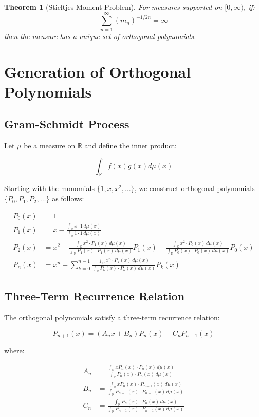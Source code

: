 \documentclass{article}
\newtheorem{theorem}{Theorem}
\begin{document}
\begin{theorem}[Stieltjes Moment Problem]
For measures supported on $[0,\infty)$, if:
\[\sum_{n=1}^{\infty} (m_n)^{-1/2n} = \infty\]
then the measure has a unique set of orthogonal polynomials.
\end{theorem}

\section{Generation of Orthogonal Polynomials}

\subsection{Gram-Schmidt Process}

Let $\mu$ be a measure on $\mathbb{R}$ and define the inner product:

\[\int_{\mathbb{R}} f(x)g(x)d\mu(x)\]

Starting with the monomials $\{1, x, x^2, \ldots\}$, we construct orthogonal polynomials $\{P_0, P_1, P_2, \ldots\}$ as follows:

\begin{align*}
P_0(x) &= 1 \\[10pt]
P_1(x) &= x - \frac{\int_{\mathbb{R}} x \cdot 1 \, d\mu(x)}{\int_{\mathbb{R}} 1 \cdot 1 \, d\mu(x)} \\[10pt]
P_2(x) &= x^2 - \frac{\int_{\mathbb{R}} x^2 \cdot P_1(x) \, d\mu(x)}{\int_{\mathbb{R}} P_1(x) \cdot P_1(x) \, d\mu(x)}P_1(x) - \frac{\int_{\mathbb{R}} x^2 \cdot P_0(x) \, d\mu(x)}{\int_{\mathbb{R}} P_0(x) \cdot P_0(x) \, d\mu(x)}P_0(x) \\[10pt]
P_n(x) &= x^n - \sum_{k=0}^{n-1} \frac{\int_{\mathbb{R}} x^n \cdot P_k(x) \, d\mu(x)}{\int_{\mathbb{R}} P_k(x) \cdot P_k(x) \, d\mu(x)}P_k(x)
\end{align*}

\subsection{Three-Term Recurrence Relation}

The orthogonal polynomials satisfy a three-term recurrence relation:

\[P_{n+1}(x) = (A_n x + B_n)P_n(x) - C_n P_{n-1}(x)\]

where:

\begin{align*}
A_n &= \frac{\int_{\mathbb{R}} xP_n(x) \cdot P_n(x) \, d\mu(x)}{\int_{\mathbb{R}} P_n(x) \cdot P_n(x) \, d\mu(x)} \\[10pt]
B_n &= \frac{\int_{\mathbb{R}} xP_n(x) \cdot P_{n-1}(x) \, d\mu(x)}{\int_{\mathbb{R}} P_{n-1}(x) \cdot P_{n-1}(x) \, d\mu(x)} \\[10pt]
C_n &= \frac{\int_{\mathbb{R}} P_n(x) \cdot P_n(x) \, d\mu(x)}{\int_{\mathbb{R}} P_{n-1}(x) \cdot P_{n-1}(x) \, d\mu(x)}
\end{align*}
\end{document}
